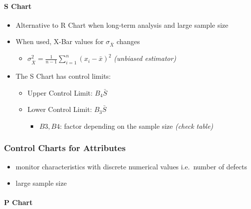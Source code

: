 \documentclass[11pt]{article}
\providecommand{\tightlist}{%
      \setlength{\itemsep}{0pt}\setlength{\parskip}{0pt}}
\begin{document}
\hypertarget{s-chart}{%
\paragraph{S Chart}\label{s-chart}}

\begin{itemize}
\tightlist
\item
  Alternative to R Chart when long-term analysis and large sample size
\item
  When used, X-Bar values for \(\sigma_{\bar X}\) changes

  \begin{itemize}
  \tightlist
  \item
    \(\sigma_{\bar X}^2=\frac{1}{n-1}\sum_{i=1}^n(x_i-\bar x)^2\)
    \emph{(unbiased estimator)}
  \end{itemize}
\item
  The S Chart has control limits:

  \begin{itemize}
  \tightlist
  \item
    Upper Control Limit: \(B_4\bar S\)
  \item
    Lower Control Limit: \(B_3\bar S\)

    \begin{itemize}
    \tightlist
    \item
      \(B3,B4\): factor depending on the sample size \emph{(check
      table)}
    \end{itemize}
  \end{itemize}
\end{itemize}

\hypertarget{control-charts-for-attributes}{%
\subsubsection{Control Charts for
Attributes}\label{control-charts-for-attributes}}

\begin{itemize}
\tightlist
\item
  monitor characteristics with discrete numerical values i.e.~number of
  defects
\item
  large sample size
\end{itemize}

\hypertarget{p-chart}{%
\paragraph{P Chart}\label{p-chart}}
\end{document}
